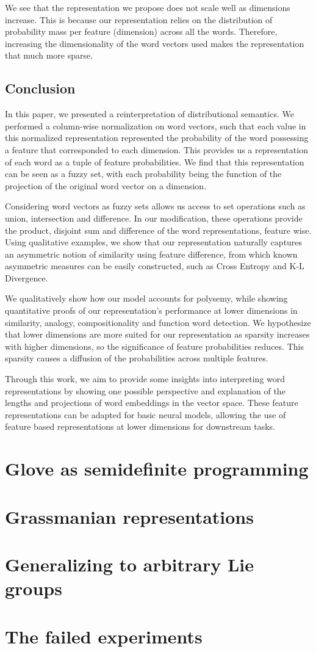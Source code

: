 \documentclass{book}
\begin{document}
We see that the representation we propose does not scale well as dimensions increase. This is because our representation relies on the distribution of probability mass per feature (dimension) across all the words. Therefore, increasing the dimensionality of the word vectors used makes the representation that much more sparse.

\section{Conclusion}
\label{sec: conclusion}

In this paper, we presented a reinterpretation of distributional semantics. We performed a column-wise normalization on word vectors, such that each value in this normalized representation represented the probability of the word possessing a feature that corresponded to each dimension. This provides us a representation of each word as a tuple of feature probabilities. We find that this representation can be seen as a fuzzy set, with each probability being the function of the projection of the original word vector on a dimension.

Considering word vectors as fuzzy sets allows us access to set operations such as union, intersection and difference. In our modification, these operations provide the product, disjoint sum and difference of the word representations, feature wise. Using qualitative examples, we show that our representation naturally captures an asymmetric notion of similarity using feature difference, from which known asymmetric measures can be easily constructed, such as Cross Entropy and K-L Divergence.

We qualitatively show how our model accounts for polysemy, while showing quantitative proofs of our representation's performance at lower dimensions in similarity, analogy, compositionality and function word detection. We hypothesize that lower dimensions are more suited for our representation as sparsity increases with higher dimensions, so the significance of feature probabilities reduces. This sparsity causes a diffusion of the probabilities across multiple features. 

Through this work, we aim to provide some insights into interpreting word representations by showing one possible perspective and explanation of the lengths and projections of word embeddings in the vector space. These feature representations can be adapted for basic neural models, allowing the use of feature based representations at lower dimensions for downstream tasks.

\chapter{Glove as semidefinite programming}
\chapter{Grassmanian representations}
\chapter{Generalizing to arbitrary Lie groups}
\chapter{The failed experiments}


\end{document}
